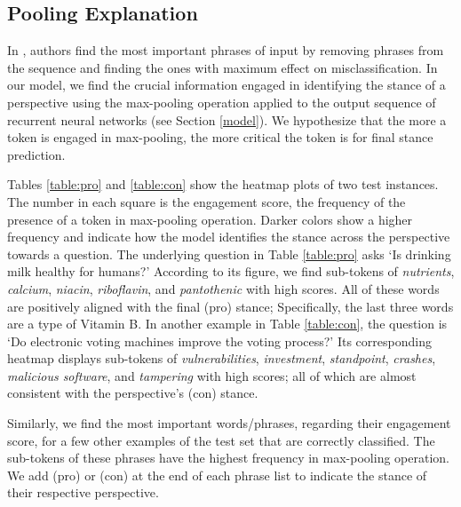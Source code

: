 \documentclass[11pt,a4paper]{article}
\begin{document}








\subsection{Pooling Explanation}
 In \cite{Popat2019STANCYSC}, authors find the most important phrases of input by removing phrases from the sequence and finding the ones with maximum effect on misclassification. In our model, we find the crucial information engaged in identifying the stance of a perspective using the max-pooling operation applied to the output sequence of recurrent neural networks (see Section \ref{model}). We hypothesize that the more a token is engaged in max-pooling, the more critical the token is for final stance prediction.
 
 
 Tables \ref{table:pro} and \ref{table:con} show the heatmap plots of two test instances. The number in each square is the engagement score, the frequency of the presence of a token in max-pooling operation. Darker colors show a higher frequency and indicate how the model identifies the stance across the perspective towards a question.
 The underlying question in Table \ref{table:pro} asks `Is drinking milk healthy for humans?' According to its figure, we find sub-tokens of \textit{nutrients}, \textit{calcium},  \textit{niacin}, \textit{riboflavin}, and \textit{pantothenic} with high scores. All of these  words are positively aligned with the final (pro) stance; Specifically, the last three words are a type of Vitamin B.  In another example in Table \ref{table:con}, the question is `Do electronic voting machines improve the voting process?'  Its corresponding heatmap displays sub-tokens of  \textit{vulnerabilities}, \textit{investment}, \textit{standpoint}, \textit{crashes}, \textit{malicious software}, and \textit{tampering} with high scores; all of which are almost consistent with the perspective's (con) stance.  
 
  Similarly, we find the most important words/phrases, regarding their engagement score, for a few other examples of the test set that are correctly classified. The sub-tokens of these phrases have the highest frequency in max-pooling operation. We add (pro) or (con)  at the end of each phrase list to indicate the stance of their respective perspective.
 
\end{document}
